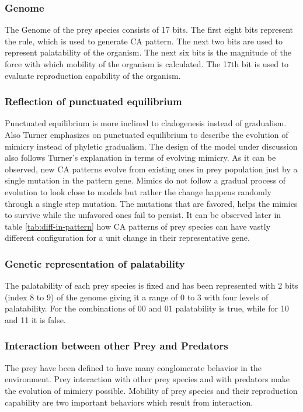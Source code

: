\documentclass[letterpaper]{article}
\numberwithin{equation}{section}
\begin{document}
\subsubsection{Genome}
The Genome of the prey species consists of 17 bits. The first eight bits represent the rule, which is used to generate CA pattern. The next two bits are used to represent palatability of the organism. The next six bits is the magnitude of the force with which mobility of the organism is calculated. The 17th bit is used to evaluate reproduction capability of the organism.

\subsubsection{Reflection of punctuated equilibrium}
\label{subsubsec:reflection-of-punctuated-equilibrium}
Punctuated equilibrium is more inclined to cladogenesis instead of gradualism. Also Turner \citep{turner1988} emphasizes on punctuated equilibrium to describe the evolution of mimicry instead of phyletic gradualism. The design of the model under discussion also follows Turner's explanation in terms of evolving mimicry. As it can be observed, new CA patterns evolve from existing ones in prey population just by a single mutation in the pattern gene. Mimics do not follow a gradual process of evolution to look close to models but rather the change happens randomly through a single step mutation. The mutations that are favored, helps the mimics to survive while the unfavored ones fail to persist. It can be observed later in table \ref{tab:diff-in-pattern} how CA patterns of prey species can have vastly different configuration for a unit change in their representative gene. 

\subsubsection{Genetic representation of palatability}
\label{subsubsec:genetic-palatability-representation}
The palatability of each prey species is fixed and has been represented with 2 bits (index 8 to 9) of the genome giving it a range of 0 to 3 with four levels of palatability. For the combinations of 00 and 01 palatability is true, while for 10 and 11 it is false.

\subsubsection{Interaction between other Prey and Predators}
The prey have been defined to have many conglomerate behavior in the environment. Prey interaction with other prey species and with predators make the evolution of mimicry possible. Mobility of prey species and their reproduction capability are two important behaviors which result from interaction. 
\end{document}
